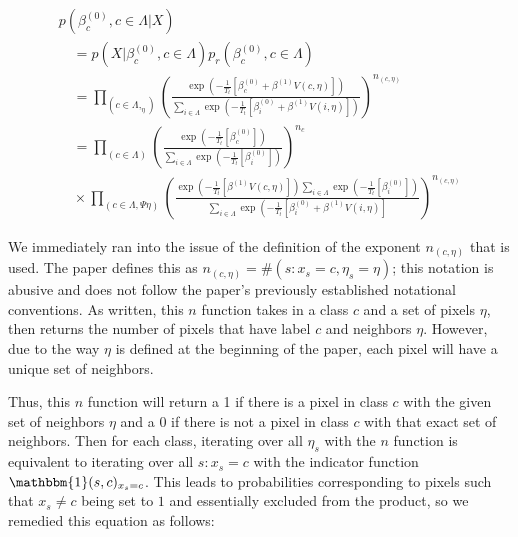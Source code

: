 \documentclass[11pt]{article}
\begin{document}
\begin{equation}
\begin{array}{l}
p\left(\beta_{c}^{(0)}, c \in \Lambda | X\right) \\
\quad=p\left(X | \beta_{c}^{(0)}, c \in \Lambda\right) p_{r}\left(\beta_{c}^{(0)}, c \in \Lambda\right) \\
\quad=\prod_{\left(c \in \Lambda, _{\eta}\right)}\left(\frac{\exp \left(-\frac{1}{T_{t}}\left[\beta_{c}^{(0)}+\beta^{(1)} V(c, \eta)\right]\right)}{\sum_{i \in \Lambda} \exp \left(-\frac{1}{T_{t}}\left[\beta_{i}^{(0)}+\beta^{(1)} V(i, \eta)\right]\right)}\right)^{n_{(c, \eta)}} \\
\quad=\prod_{(c \in \Lambda)}\left(\frac{\exp \left(-\frac{1}{T_{t}}\left[\beta_{c}^{(0)}\right]\right)}{\sum_{i \in \Lambda} \exp \left(-\frac{1}{T_{t}}\left[\beta_{i}^{(0)}\right]\right)}\right)^{n_{c}} \\
\quad \times \prod_{(c \in \Lambda, \Psi \eta)}\left(\frac{\exp \left(-\frac{1}{T_{t}}\left[\beta^{(1)} V(c, \eta)\right]\right) \sum_{i \in \Lambda} \exp \left(-\frac{1}{T_{t}}\left[\beta_{i}^{(0)}\right]\right)}{\sum_{i \in \Lambda} \exp \left(-\frac{1}{T_{t}}\left[\beta_{i}^{(0)}+\beta^{(1)} V(i, \eta)\right]\right.}\right)^{n_{(c, \eta)}}
\end{array}
\end{equation}

We immediately ran into the issue of the definition of the exponent $n_{(c, \eta)}$ that is used.
The paper defines this as $n_{(c, \eta)}=\#\left(s: x_{s}=c, \eta_{s}=\eta\right)$;
this notation is abusive and does not follow the paper's previously established notational conventions.
As written, this $n$ function takes in a class $c$ and a set of pixels $\eta$, then returns the number of pixels that have label $c$ and neighbors $\eta$.
However, due to the way $\eta$ is defined at the beginning of the paper, each pixel will have a unique set of neighbors.

Thus, this $n$ function will return a 1 if there is a pixel in class $c$ with the given set of neighbors $\eta$ and a $0$ if there is not a pixel in class $c$ with that exact set of neighbors.
Then for each class, iterating over all $\eta_s$ with the $n$ function is equivalent to iterating over all $s: x_s = c$ with the indicator function $\mathbbm{1}(s,c)_{x_s = c}$.
This leads to probabilities corresponding to pixels such that $x_{s} \neq c$ being set to $1$ and essentially excluded from the product, so we remedied this equation as follows:
\end{document}
